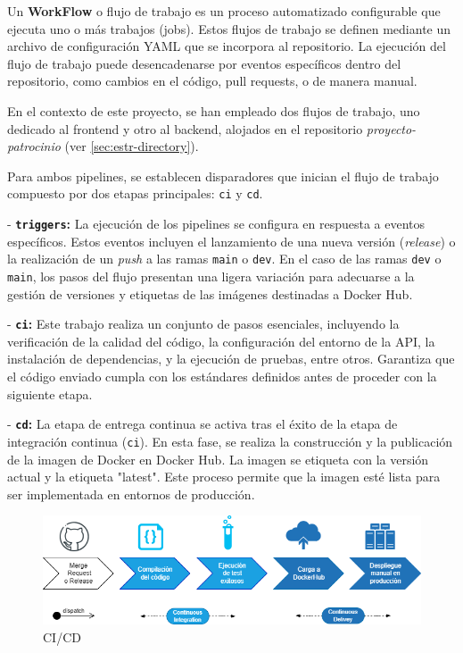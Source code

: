 Un \textbf{WorkFlow} o flujo de trabajo es un proceso automatizado configurable que ejecuta uno o más trabajos (jobs). Estos flujos de trabajo se definen mediante un archivo de configuración YAML que se incorpora al repositorio. La ejecución del flujo de trabajo puede desencadenarse por eventos específicos dentro del repositorio, como cambios en el código, pull requests, o de manera manual.

En el contexto de este proyecto, se han empleado dos flujos de trabajo, uno dedicado al frontend y otro al backend, alojados en el repositorio \textit{proyecto-patrocinio} (ver \ref{sec:estr-directory}).

Para ambos pipelines, se establecen disparadores que inician el flujo de trabajo compuesto por dos etapas principales: \texttt{ci} y \texttt{cd}.

- \textbf{\texttt{triggers}:} La ejecución de los pipelines se configura en respuesta a eventos específicos. Estos eventos incluyen el lanzamiento de una nueva versión (\textit{release}) o la realización de un \textit{push} a las ramas \texttt{main} o \texttt{dev}. En el caso de las ramas \texttt{dev} o \texttt{main}, los pasos del flujo presentan una ligera variación para adecuarse a la gestión de versiones y etiquetas de las imágenes destinadas a Docker Hub.

- \textbf{\texttt{ci}:} Este trabajo realiza un conjunto de pasos esenciales, incluyendo la verificación de la calidad del código, la configuración del entorno de la API, la instalación de dependencias, y la ejecución de pruebas, entre otros. Garantiza que el código enviado cumpla con los estándares definidos antes de proceder con la siguiente etapa.

- \textbf{\texttt{cd}:} La etapa de entrega continua se activa tras el éxito de la etapa de integración continua (\texttt{ci}). En esta fase, se realiza la construcción y la publicación de la imagen de Docker en Docker Hub. La imagen se etiqueta con la versión actual y la etiqueta "latest". Este proceso permite que la imagen esté lista para ser implementada en entornos de producción.



\begin{figure}[h]
    \centering
    \includegraphics[width=1\linewidth]{fig/cicd.png}
    \caption{CI/CD}
    \label{fig:ci-cd}
\end{figure}

